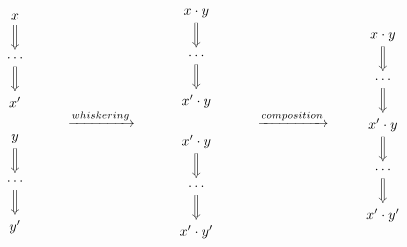 \documentclass[../generics]{subfiles}
\begin{document}
\begin{figure}\label{monoid operation well defined}
\begin{ceqn}
\[
\begin{array}{c}
\begin{tikzcd}
x\arrow[d, Rightarrow]\\
\cdots\arrow[d, Rightarrow]\\
x^\prime
\end{tikzcd}\\
\\
\begin{tikzcd}
y\arrow[d, Rightarrow]\\
\cdots\arrow[d, Rightarrow]\\
y^\prime
\end{tikzcd}
\end{array} \qquad \xrightarrow{whiskering} \qquad
\begin{array}{c}
\begin{tikzcd}
x\cdot y\arrow[d, Rightarrow]\\
\cdots \arrow[d, Rightarrow]\\
x^\prime\cdot y
\end{tikzcd}\\
\\
\begin{tikzcd}
x^\prime\cdot y\arrow[d, Rightarrow]\\
\cdots\arrow[d, Rightarrow]\\
x^\prime\cdot y^\prime
\end{tikzcd}
\end{array} \qquad \xrightarrow{composition} \qquad
\begin{tikzcd}
x\cdot y\arrow[d, Rightarrow]\\
\cdots\arrow[d, Rightarrow]\\
x^\prime\cdot y\arrow[d, Rightarrow]\\
\cdots\arrow[d, Rightarrow]\\
x^\prime\cdot y^\prime
\end{tikzcd}
\]
\end{ceqn}
\end{figure}
\end{document}
